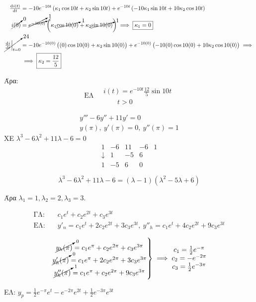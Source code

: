 \documentclass[11pt,a4paper,titlepage,final]{article}
\begin{document}
\begin{exercise*}{5.5}
\begin{align*}
\od{i(t)}{t}&=-10e^{-10t}\left(
\kappa_1\cos10t+\kappa_2\sin10t
\right)+
e^{-10t}\left(
-10\kappa_1\sin10t+10\kappa_2\cos10t
\right)\\
\cancelto{0}{i(0)}&=\cancelto{1}{e^{\cancelto{0}{-10(0)}}}\left(
\kappa_1 \cancelto{1}{\cos10(0)} + \kappa_2 \cancelto{1}{\sin10(0)}
\right) \implies \boxed{
\kappa_1=0
}\\
\cancelto{24}{\left.\od{i}{t}\right|_{t=0}} &=
-10e^{-10(0)}\left(
(0)\cos10(0)+\kappa_2\sin10(0)
\right)+e^{-10(0)}\left(-10(0)\cos10(0)+10\kappa_2\cos10(0)\right)
\implies
\\  &\implies
 \boxed{\kappa_2=\frac{12}{5}}
\end{align*}

Άρα:
\[
\boxed{
\text{ΕΛ} \quad
\begin{array}{l}
i(t) = e^{-10t} \frac{12}{5}\sin10t\\
\qquad t>0
\end{array}
}
\]

\end{exercise*}

\begin{exercise*}{5.16}
	\begin{gather*}
	y'''-6y''+11y'=0\\
	y(\pi),\ y'(\pi)=0,\ y''(\pi)=1
	\end{gather*}
	\tcblower
	ΧΕ \(\lambda^3-6\lambda^2+11\lambda-6=0\)
	\[
	\begin{array}{rrrr|l}
	1&-6&11&-6 & 1\\
	\downarrow & 1 & -5 & 6 & \\
	1 & -5 & 6 & 0
	\end{array}
	\]

	\[
	\lambda ^3-6\lambda ^2+11\lambda -6=(\lambda -1)(\lambda ^2-5\lambda +6)
	\]

	Άρα $\lambda_1=1,\lambda _2=2,\lambda _3=3$.

	\[
	\begin{matrix}
	\text{ΓΛ:} \quad & c_1e^t+c_2e^{2t}+c_3e^{3t}\\
	\text{ΕΛ:} \quad & y'_n = c_1e^t+2c_2e^{2t}+3c_3e^{3t},\ y''_h = c_1e^t+4c_2e^{2t}+9c_3e^{3t}
	\end{matrix}
	\]

	\[
	\left.
	\begin{matrix}
	\cancelto{0}{y_h(\pi)}=c_1e^\pi +c_2e^{2\pi}+c_3e^{3\pi}\\
	\cancelto{0}{y'_h(\pi)}=c_1e^\pi +2c_2e^{2\pi}+3c_3e^{3\pi}\\
	\cancelto{1}{y''_h(\pi)} = c_1e^\pi+c_2e^{2\pi}+9c_3e^{3\pi}
	\end{matrix}
	\right\rbrace
	\implies
	\begin{matrix}
	c_1 = \frac{1}{2}e^{-\pi}\\
	c_2 = -e^{-2\pi}\\
	c_3 = \frac{1}{2}e^{-3\pi}
	\end{matrix}
	\]

	ΕΛ: \(y_p = \frac{1}{2}e^{-\pi}e^t-e^{-2\pi}e^{2t}+\frac{1}{2}e^{-3\pi}e^{3t}\)
\end{exercise*}
\end{document}
